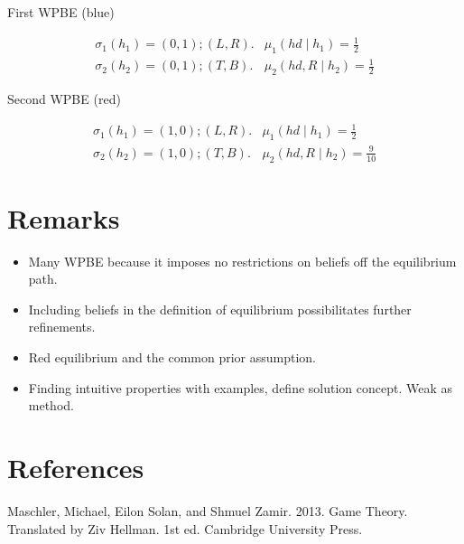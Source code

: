 \documentclass[10pt]{article}
\begin{document}
First WPBE (blue)

$$
\begin{array}{ll}
\sigma_{1}\left(h_{1}\right)=(0,1) ;(L, R) . & \mu_{1}\left(h d \mid h_{1}\right)=\frac{1}{2} \\
\sigma_{2}\left(h_{2}\right)=(0,1) ;(T, B) . & \mu_{2}\left(h d, R \mid h_{2}\right)=\frac{1}{2}
\end{array}
$$

Second WPBE (red)

$$
\begin{array}{ll}
\sigma_{1}\left(h_{1}\right)=(1,0) ;(L, R) . & \mu_{1}\left(h d \mid h_{1}\right)=\frac{1}{2} \\
\sigma_{2}\left(h_{2}\right)=(1,0) ;(T, B) . & \mu_{2}\left(h d, R \mid h_{2}\right)=\frac{9}{10}
\end{array}
$$

\section*{Remarks}
\begin{itemize}
  \item Many WPBE because it imposes no restrictions on beliefs off the equilibrium path.
  \item Including beliefs in the definition of equilibrium possibilitates further refinements.
  \item Red equilibrium and the common prior assumption.
  \item Finding intuitive properties with examples, define solution concept. Weak as method.
\end{itemize}

\section*{References}
Maschler, Michael, Eilon Solan, and Shmuel Zamir. 2013. Game Theory. Translated by Ziv Hellman. 1st ed. Cambridge University Press.
\end{document}
